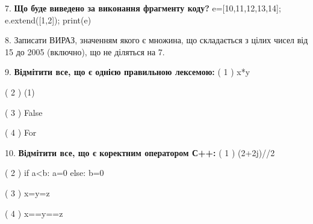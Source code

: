 \documentclass[11pt]{article}
\begin{document}
\vspace{5mm}

7. \textbf{Що буде виведено за виконання фрагменту коду?}
e=[10,11,12,13,14]; e.extend([1,2]); print(e)\vspace{5mm}

8. 
Записати ВИРАЗ, значенням якого є множина, що складається з цілих чисел від 15 до 2005 (включно), що не діляться на 7.\vspace{5mm}

9. %
\textbf{Відмітити все, що є однією правильною лексемою:}
( 1 ) x*y

( 2 ) (1)

( 3 ) False

( 4 ) For
\vspace{5mm}

10. %
\textbf{Відмітити все, що є коректним оператором С++:}
( 1 ) (2+2j)//2

( 2 ) if a<b: a=0 else: b=0

( 3 ) x=y=z

( 4 ) x==y==z
\vspace{5mm}

\newpage
\end{document}
